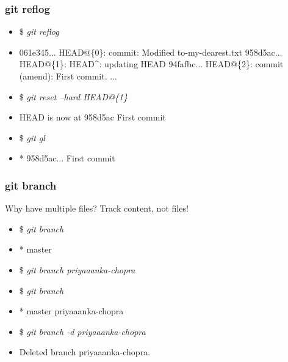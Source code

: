 \documentclass[10pt]{beamer}
\newcommand{\command}[1]{\textsl{\textit{#1}}}
\begin{document}
\begin{frame}[fragile]
\frametitle{git reflog}

\begin{block}{}
\scriptsize
\begin{semiverbatim}
\begin{itemize}[<+-| alert@+>]
\item[]{\$ \command{git reflog}}
\item[]{061e345... HEAD@\{0\}: commit: Modified to-my-dearest.txt
958d5ac... HEAD@\{1\}: HEAD^: updating HEAD
94fafbc... HEAD@\{2\}: commit (amend): First commit.
...}

\item[]{\$ \command{git reset --hard HEAD@\{1\}}}
\item[]{HEAD is now at 958d5ac First commit}

\item[]{\$ \command{git gl}}
\item[]{* 958d5ac... First commit}
\end{itemize}
\end{semiverbatim}
\end{block}

\end{frame}

%
%

\begin{frame}[fragile]
\frametitle{git branch}

Why have multiple files? Track content, not files!

\begin{block}{}
\scriptsize
\begin{semiverbatim}
\begin{itemize}[<+-| alert@+>]
\item[]{\$ \command{git branch}}
\item[]{* master}

\item[]{\$ \command{git branch priyaaanka-chopra}}

\item[]{\$ \command{git branch}}
\item[]{* master
  priyaaanka-chopra}

\item[]{\$ \command{git branch -d priyaaanka-chopra}}
\item[]{Deleted branch priyaaanka-chopra.}
\end{itemize}
\end{semiverbatim}
\end{block}

\end{frame}
\end{document}
